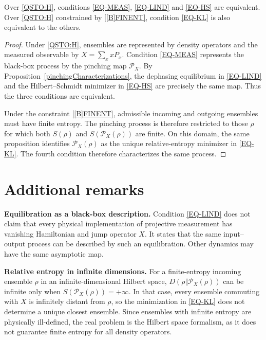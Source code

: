 \documentclass{techbrief}
\begin{document}
\begin{thrm}
	Over \ref{QSTO:H}, conditions \ref{EQ-MEAS}, \ref{EQ-LIND} and \ref{EQ-HS} are equivalent. Over \ref{QSTO:H} constrained by \ref{[B]FINENT}, condition \ref{EQ-KL} is also equivalent to the others.
\end{thrm}

\begin{proof}
	Under \ref{QSTO:H}, ensembles are represented by density operators and the measured observable by $X=\sum_xxP_x$. Condition \ref{EQ-MEAS} represents the black-box process by the pinching map $\mathcal{P}_X$. By Proposition~\ref{pinchingCharacterizations}, the dephasing equilibrium in \ref{EQ-LIND} and the Hilbert--Schmidt minimizer in \ref{EQ-HS} are precisely the same map. Thus the three conditions are equivalent.

	Under the constraint \ref{[B]FINENT}, admissible incoming and outgoing ensembles must have finite entropy. The pinching process is therefore restricted to those $\rho$ for which both $S(\rho)$ and $S(\mathcal{P}_X(\rho))$ are finite. On this domain, the same proposition identifies $\mathcal{P}_X(\rho)$ as the unique relative-entropy minimizer in \ref{EQ-KL}. The fourth condition therefore characterizes the same process.
\end{proof}

\section{Additional remarks}

\textbf{Equilibration as a black-box description.} Condition \ref{EQ-LIND} does not claim that every physical implementation of projective measurement has vanishing Hamiltonian and jump operator $X$. It states that the same input--output process can be described by such an equilibration. Other dynamics may have the same asymptotic map.

\textbf{Relative entropy in infinite dimensions.} For a finite-entropy incoming ensemble $\rho$ in an infinite-dimensional Hilbert space, $D(\rho\Vert\mathcal{P}_X(\rho))$ can be infinite only when $S(\mathcal{P}_X(\rho))=+\infty$. In that case, every ensemble commuting with $X$ is infinitely distant from $\rho$, so the minimization in \ref{EQ-KL} does not determine a unique closest ensemble. Since ensembles with infinite entropy are physically ill-defined, the real problem is the Hilbert space formalism, as it does not guarantee finite entropy for all density operators.
\end{document}
